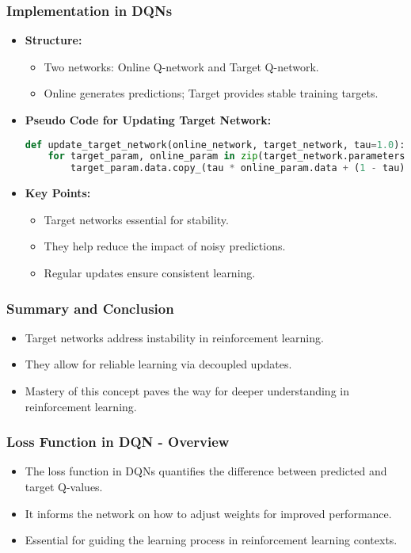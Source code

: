 \documentclass[aspectratio=169]{beamer}
\begin{document}
\begin{frame}[fragile]
    \frametitle{Implementation in DQNs}
    \begin{itemize}
        \item \textbf{Structure:}
            \begin{itemize}
                \item Two networks: Online Q-network and Target Q-network.
                \item Online generates predictions; Target provides stable training targets.
            \end{itemize}
        
        \item \textbf{Pseudo Code for Updating Target Network:}
        \begin{lstlisting}[language=Python]
def update_target_network(online_network, target_network, tau=1.0):
    for target_param, online_param in zip(target_network.parameters(), online_network.parameters()):
        target_param.data.copy_(tau * online_param.data + (1 - tau) * target_param.data)
        \end{lstlisting}
        
        \item \textbf{Key Points:}
            \begin{itemize}
                \item Target networks essential for stability.
                \item They help reduce the impact of noisy predictions.
                \item Regular updates ensure consistent learning.
            \end{itemize}
    \end{itemize}
\end{frame}

\begin{frame}[fragile]
    \frametitle{Summary and Conclusion}
    \begin{itemize}
        \item Target networks address instability in reinforcement learning.
        \item They allow for reliable learning via decoupled updates.
        \item Mastery of this concept paves the way for deeper understanding in reinforcement learning.
    \end{itemize}
\end{frame}

\begin{frame}[fragile]
    \frametitle{Loss Function in DQN - Overview}
    \begin{itemize}
        \item The loss function in DQNs quantifies the difference between predicted and target Q-values.
        \item It informs the network on how to adjust weights for improved performance.
        \item Essential for guiding the learning process in reinforcement learning contexts.
    \end{itemize}
\end{frame}
\end{document}
